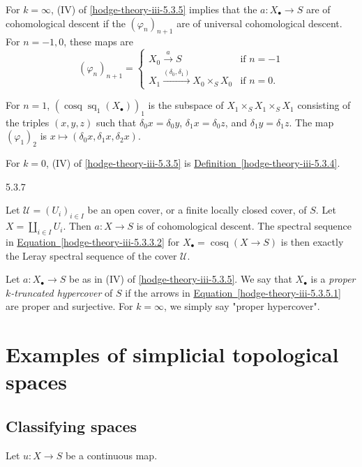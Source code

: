 \begin{enumerate}
    \end{enumerate}\label{hodge-theory-iii-5.3.6}\par{}For \(k=\infty \), (IV) of \cref{hodge-theory-iii-5.3.5} implies that the \(a\colon  X_\bullet \to  S\) are of cohomological descent if the \((\varphi _n)_{n+1}\) are of universal cohomological descent.
    For \(n=-1,0\), these maps are
    \[       (\varphi _n)_{n+1}       =       \begin {cases}         X_0\xrightarrow {a}S         &\text {if }n=-1       \\X_1\xrightarrow {(\delta _0,\delta _1)}X_0\times _S X_0         &\text {if }n=0.       \end {cases}     \]
    
    For \(n=1\), \((\operatorname {cosq}\operatorname {sq}_1(X_\bullet ))_1\) is the subspace of \(X_1\times _S X_1\times _S X_1\) consisting of the triples \((x,y,z)\) such that \(\delta _0x=\delta _0y\), \(\delta _1x=\delta _0z\), and \(\delta _1y=\delta _1z\).
    The map \((\varphi _1)_2\) is \(x\mapsto (\delta _0x,\delta _1x,\delta _2x)\).\par{}For \(k=0\), (IV) of \cref{hodge-theory-iii-5.3.5} is \hyperref[hodge-theory-iii-5.3.4]{Definition~\ref*{hodge-theory-iii-5.3.4}}.\begin{example}{5.3.7}\label{hodge-theory-iii-5.3.7}\skipsinglepar\par{}Let \(\mathscr {U}=(U_i)_{i\in  I}\) be an open cover, or a finite locally closed cover, of \(S\).
    Let \(X=\coprod _{i\in  I}U_i\).
    Then \(a\colon  X\to  S\) is of cohomological descent.
    The spectral sequence in \hyperref[hodge-theory-iii-5.3.3.2]{Equation~\ref*{hodge-theory-iii-5.3.3.2}} for \(X_\bullet =\operatorname {cosq}(X\to  S)\) is then exactly the Leray spectral sequence of the cover \(\mathscr {U}\).\end{example}\label{hodge-theory-iii-5.3.8}\par{}Let \(a\colon  X_\bullet \to  S\) be as in (IV) of \cref{hodge-theory-iii-5.3.5}.
    We say that \(X_\bullet \) is a \emph{proper \(k\)-truncated hypercover} of \(S\) if the arrows in \hyperref[hodge-theory-iii-5.3.5.1]{Equation~\ref*{hodge-theory-iii-5.3.5.1}} are proper and surjective.
    For \(k=\infty \), we simply say "proper hypercover".\chapter{Examples of simplicial topological spaces}\thispagestyle{fancy}\label{hodge-theory-iii-6}\section{Classifying spaces}\label{hodge-theory-iii-6.1}\label{hodge-theory-iii-6.1.1}\par{}Let \(u\colon  X\to  S\) be a continuous map.
